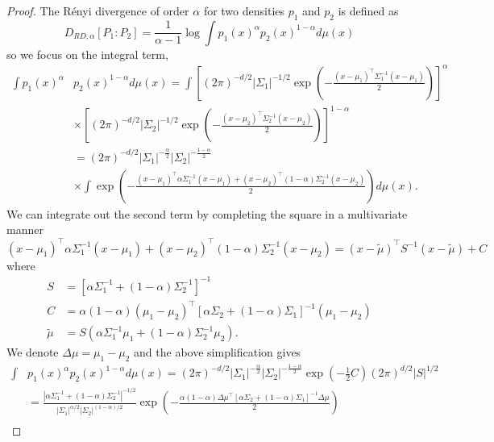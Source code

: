 \documentclass[11pt]{article}
\newcommand{\Renyi}{R\'{e}nyi }
\begin{document}
\begin{proof}
	The \Renyi divergence of order $\alpha$ for two densities $p_1$ and $p_2$ is defined as
	\begin{equation*}
	D_{RD,\alpha}[P_1:P_2] = \frac{1}{\alpha-1} \log \int p_1 (x)^\alpha p_2 (x)^{1-\alpha } d\mu(x)
	\end{equation*}
	so we focus on the integral term, 
	\begin{align*}
	\int p_1 (x)^\alpha &p_2 (x)^{1-\alpha } d\mu(x) = \int \left[ (2\pi)^{-d/2} |\Sigma_1|^{-1/2} \exp \left( -\frac{(x-\mu_1)^\top \Sigma_1^{-1} (x-\mu_1)}{2} \right) \right]^{\alpha} \\
	& \times \left[ (2\pi)^{-d/2} |\Sigma_2|^{-1/2} \exp \left( -\frac{(x-\mu_2)^\top \Sigma_2^{-1} (x-\mu_2)}{2} \right) \right]^{1-\alpha} \\
	&= (2\pi)^{-d/2} |\Sigma_1|^{-\frac{\alpha}{2}} |\Sigma_2|^{-\frac{1-\alpha}{2}}\\
	& \times
	\int\exp\left(-\frac{ (x-\mu_1)^\top \alpha \Sigma_1^{-1} (x-\mu_1) + (x-\mu_2)^\top (1-\alpha) \Sigma_2^{-1} (x-\mu_2) }{2}\right)d\mu(x).
	\end{align*}
	We can integrate out the second term by completing the square in a multivariate manner
	\begin{equation*}
	(x-\mu_1)^\top \alpha \Sigma_1^{-1} (x-\mu_1) + (x-\mu_2)^\top (1-\alpha) \Sigma_2^{-1} (x-\mu_2) = (x-\tilde{\mu})^\top S^{-1} (x-\tilde{\mu}) + C
	\end{equation*}
	where
	\begin{align*}
	S &= \left[\alpha \Sigma_1^{-1} + (1-\alpha) \Sigma_2^{-1}\right]^{-1} \\
		C &= \alpha(1-\alpha) (\mu_1-\mu_2)^\top \left[
		\alpha \Sigma_2 + (1-\alpha) \Sigma_1
		\right]^{-1} (\mu_1-\mu_2)\\
	\tilde{\mu} &= S \left( \alpha \Sigma_1^{-1} \mu_1 + (1-\alpha) \Sigma_2^{-1} \mu_2 \right).
	\end{align*}
	We denote $\Delta \mu = \mu_1 - \mu_2$ and the above simplification gives 
	\begin{align*}
	\int &p_1 (x)^\alpha p_2 (x)^{1-\alpha } d\mu(x) = (2\pi)^{-d/2} |\Sigma_1|^{-\frac{\alpha}{2}} |\Sigma_2|^{-\frac{1-\alpha}{2}} \exp\left(-\frac{1}{2}C\right) (2\pi)^{d/2} |S|^{1/2}\\
	&= \frac{| \alpha \Sigma_1^{-1} + (1-\alpha)\Sigma_2^{-1}|^{-1/2}}{|\Sigma_1|^{\alpha/2} |\Sigma_2|^{(1-\alpha)/2}} \exp\left(-\frac{\alpha(1-\alpha) \Delta \mu^\top \left[
		\alpha \Sigma_2 + (1-\alpha) \Sigma_1
		\right]^{-1} \Delta \mu}{2} \right)\\

\end{align*}
\end{proof}
\end{document}
